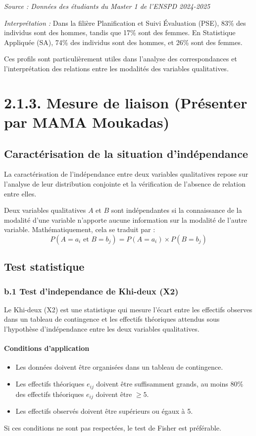 \documentclass[a4paper,12pt]{article}
\begin{document}
\textit{Source : Données des étudiants du Master 1 de l’ENSPD 2024-2025}

\textit{Interprétation :} Dans la filière Planification et Suivi Évaluation (PSE), 83\% des individus sont des hommes, tandis que 17\% sont des femmes. En Statistique Appliquée (SA), 74\% des individus sont des hommes, et 26\% sont des femmes.

Ces profils sont particulièrement utiles dans l’analyse des correspondances et l’interprétation des relations entre les modalités des variables qualitatives.

\section{2.1.3. Mesure de liaison (Présenter par MAMA Moukadas)}

\subsection{Caractérisation de la situation d’indépendance}

La caractérisation de l'indépendance entre deux variables qualitatives repose sur l'analyse de leur distribution conjointe et la vérification de l'absence de relation entre elles. 

Deux variables qualitatives \( A \) et \( B \) sont indépendantes si la connaissance de la modalité d'une variable n'apporte aucune information sur la modalité de l'autre variable. Mathématiquement, cela se traduit par :
\[
P(A = a_i \text{ et } B = b_j) = P(A = a_i) \times P(B = b_j)
\]

\subsection{Test statistique}

\subsubsection{b.1 Test d’independance de Khi-deux (X2)}

Le Khi-deux (X2) est une statistique qui mesure l'écart entre les effectifs observes dans un tableau de contingence et les effectifs théoriques attendus sous l'hypothèse d'indépendance entre les deux variables qualitatives.

\paragraph{Conditions d'application}
\begin{itemize}
    \item Les données doivent être organisées dans un tableau de contingence.
    \item Les effectifs théoriques \( e_{ij} \) doivent être suffisamment grands, au moins 80\% des effectifs théoriques \( e_{ij} \) doivent être \( \geq 5 \).
    \item Les effectifs observés doivent être supérieurs ou égaux à 5.
\end{itemize}
Si ces conditions ne sont pas respectées, le test de Fisher est préférable.
\end{document}
